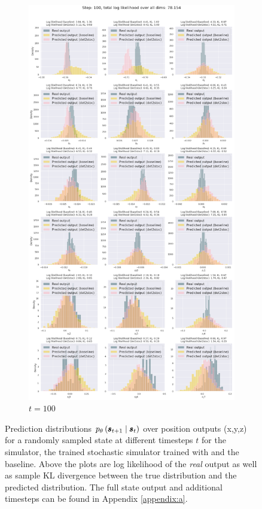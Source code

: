 \begin{figure}
\begin{subfigure}{\textwidth}
\end{subfigure}
\begin{subfigure}{\textwidth}
    \centering
    \includegraphics[trim=0 1650 0 50,clip,width=1.0\textwidth]
    {img/windyslope/output/output_distribution_step100_delta_all}
    \caption{$t=100$}
    \label{fig:output_distribution_step50_posvel_dettostoc}
\end{subfigure}
\caption{Prediction distributions $\ptheta \protect \given*{\vns}{\vs}$ over position outputs (x,y,z) for a randomly sampled state at different timesteps $t$ for the simulator, the trained stochastic simulator trained with \dettostoc{} and the baseline. Above the plots are log likelihood of the \emph{real} output as well as sample KL divergence between the true distribution and the predicted distribution.
The full state output and additional timesteps can be found in Appendix \ref{appendix:a}.}
\end{figure}

